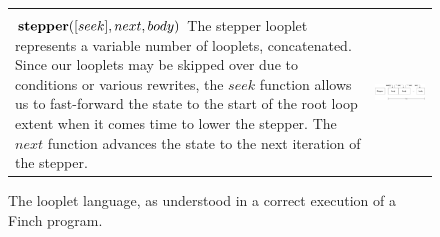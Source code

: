 \begin{figure}[ht]
\begin{tabular} {|l|c|}
\begin{minipage}[c]{0.35\linewidth}
    \end{minipage} \\
    \begin{minipage}[c]{0.65\linewidth}
        $\text{\textbf{stepper}}([seek], next, body)$ The stepper looplet
        represents a variable number of looplets, concatenated. Since our
        looplets may be skipped over due to conditions or various rewrites, the
        $seek$ function allows us to fast-forward the state to the start of the
        root loop extent when it comes time to lower the stepper. The $next$
        function advances the state to the next iteration of the stepper. 
    \end{minipage} &
    \begin{minipage}[c]{0.35\linewidth}
        \centering
        \includegraphics[scale=0.20]{Looplets-stepper.png}
    \end{minipage}
    \end{tabular}
    \caption{The looplet language, as understood in a correct execution of a Finch program.}
\end{figure}